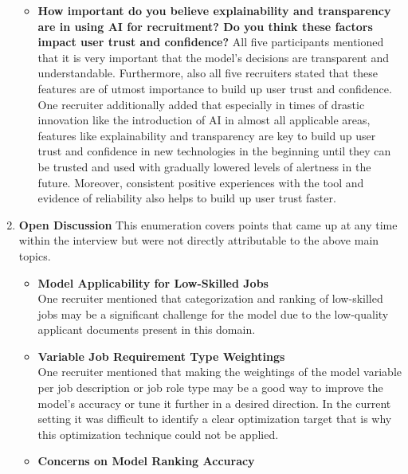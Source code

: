 \documentclass[draft,final]{thesisclass} %
\begin{document}
\begin{enumerate}
\begin{itemize}
        \item \textbf{How important do you believe explainability and transparency are in using \acs{AI} for recruitment? Do you think these factors impact user trust and confidence?}
        All five participants mentioned that it is very important that the model's decisions are transparent and understandable. Furthermore, also all five recruiters stated that these features are of utmost importance to build up user trust and confidence. One recruiter additionally added that especially in times of drastic innovation like the introduction of \acs{AI} in almost all applicable areas, features like explainability and transparency are key to build up user trust and confidence in new technologies in the beginning until they can be trusted and used with gradually lowered levels of alertness in the future. Moreover, consistent positive experiences with the tool and evidence of reliability also helps to build up user trust faster.
    \end{itemize}
    \item \textbf{Open Discussion}
    This enumeration covers points that came up at any time within the interview but were not directly attributable to the above main topics.
    \begin{itemize}
        \item \textbf{Model Applicability for Low-Skilled Jobs}\\
        One recruiter mentioned that categorization and ranking of low-skilled jobs may be a significant challenge for the model due to the low-quality applicant documents present in this domain.
        \item \textbf{Variable Job Requirement Type Weightings}\\
        One recruiter mentioned that making the weightings of the model variable per job description or job role type may be a good way to improve the model's accuracy or tune it further in a desired direction. In the current setting it was difficult to identify a clear optimization target that is why this optimization technique could not be applied.
        \item \textbf{Concerns on Model Ranking Accuracy}\\

\end{itemize}
\end{enumerate}
\end{document}
